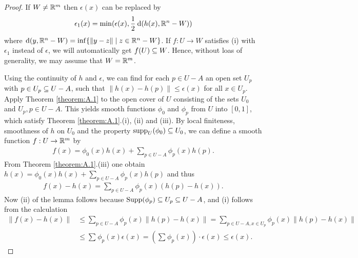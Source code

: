 \begin{proof}
  If $W\neq {\ensuremath{\mathbb{R}}}^m$ then $\epsilon(x)$ can be replaced by  
  \begin{align*}
    \epsilon_1(x) = \min(\epsilon(x), \frac12\dd(h(x), \RR^n-W))
  \end{align*}
  where $\dd(y, \RR^n-W) = \inf\{\|y-z\|\mid z\in\RR^n-W\}$. If $f:U\to W$ satisfies (i) with 
  $\epsilon_1$ instead of $\epsilon$, we will automatically get $f(U)\subseteq W$. Hence, without loas of generality,
  we may assume that $W = {\mathbb{R}}^m$.
  
  Using the continuity of $h$ and $\epsilon$, we can find for each $p\in U-A$ an open set 
  $U_p$ with $p\in U_p\subseteq U-A$, such that $\|h(x) - h(p)\|\le \epsilon(x)$ for all $x\in U_p$.
  Apply Theorem \ref{theorem:A.1} to the open cover of $U$ consisting of the sets $U_0$ and $U_p, p\in U-A$.
  This yields smooth functions $\phi_0$ and $\phi_p$ from $U$ into $[0,1]$, which satisfy Theorem
  \ref{theorem:A.1}.(i), (ii) and (iii). By local finiteness, smoothness of $h$ on $U_0$ and the property
  $\operatorname{supp}_U(\phi_0) \subseteq U_0$, we can define a smooth function $f:U\to{\ensuremath{\mathbb{R}}}^m$ by
  \begin{align*}
    f(x) = \phi_0(x)h(x) + \sum_{p\in U-A}\phi_p(x)h(p).
  \end{align*}
  From Theorem \ref{theorem:A.1}.(iii) one obtain $h(x) = \phi_0(x)h(x) + \sum_{p\in U-A}\phi_p(x)h(p)$ and 
  thus 
  \begin{align*}
    f(x) - h(x) = \sum_{p\in U-A}\phi_p(x)(h(p)-h(x)).
  \end{align*}
  Now (ii) of the lemma follows because $\mathrm{Supp}(\phi_p)\subseteq U_p\subseteq U-A$, and (i) follows from the calculation
  \begin{align*}
    \|f(x) - h(x)\|
      & \le \sum_{p\in U-A}\phi_p(x)\|h(p)-h(x)\|
        = \sum_{p\in U-A, x\in U_p}\phi_p(x)\|h(p)-h(x)\| \\
      & \le \sum_{}^{}{\phi_p(x)\epsilon(x)} 
        = \left(\sum_{}^{}{\phi_p(x)}\right)\cdot \epsilon(x)
        \le \epsilon(x).
  \end{align*}
\end{proof}